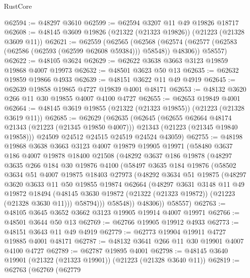 \begin{lexlean}{RustCore}
\begin{coremodule}
@62594 := @48297 @3610
@62599 := @62594 @3207 @11 @49 @19826 @18717
@62608 := @48145 @3609 @19826 (@21322 (@21323 @19826)) (@21223 (@21328 @3609 @11))
@62621 := @62559
    (@62565
      (@62568 (@62574 (@62577 (@62583 (@62586 (@62593 (@62599 @62608 @59384))) @58548)) @48306))
      @58557)
@62622 := @48105 @3624
@62629 := @62622 @3638 @3663 @3123 @19859 @19868 @4007 @19973
@62632 := @48501 @3623 @50 @13
@62635 := @62632 @19859 @19866 @4933
@62639 := @48151 @3622 @11 @49 @4919
@62645 := @62639 @19858 @19865 @4727 @19839 @4001 @48171
@62653 := @48132 @3620 @266 @11 @30 @19855 @4007 @4100 @4727
@62655 := @62653 @19849 @4001
@62664 := @48145 @3619 @19855 (@21322 (@21323 @19855)) (@21223 (@21328 @3619 @11))
@62685 := @62629
    (@62635
      (@62645
        (@62655 @62664 @48174 @21343 (@21223 (@21345 @19850 @4007)))
        @21343
        (@21223 (@21345 @19840 @19858)))
      @24509
      @24512
      @24515
      @24519
      @24524
      @43059)
@62755 := @48198
    @19868
    @3638
    @3663
    @3123
    @4007
    @19879
    @19905
    @19971
    (@58480
      @3637
      @186
      @4007
      @19878
      @18400
      @21508
      (@48292
        @3637
        @186
        @19878
        (@48297
          @3635
          @266
          @184
          @30
          @19876
          @4100
          (@58497
            @3635
            @184
            @19876
            (@58502
              @3634
              @51
              @4007
              @19875
              @18403
              @27973
              (@48292
                @3634
                @51
                @19875
                (@48297
                  @3620
                  @3633
                  @11
                  @50
                  @19855
                  @19874
                  @62664
                  (@48297
                    @3631
                    @3148
                    @11
                    @49
                    @19872
                    @18494
                    (@48145 @3630 @19872 (@21322 (@21323 @19872)) (@21223 (@21328 @3630 @11)))
                    @58794)))
              @58548))
          @48306))
      @58557)
@62763 := @48105 @3645 @3652 @3662 @3123 @19905 @19914 @4007 @19971
@62766 := @48501 @3644 @50 @13
@62769 := @62766 @19905 @19912 @4933
@62773 := @48151 @3643 @11 @49 @4919
@62779 := @62773 @19904 @19911 @4727 @19885 @4001 @48171
@62787 := @48132 @3641 @266 @11 @30 @19901 @4007 @4100 @4727
@62789 := @62787 @19895 @4001
@62798 := @48145 @3640 @19901 (@21322 (@21323 @19901)) (@21223 (@21328 @3640 @11))
@62819 := @62763
    (@62769
      (@62779

\end{coremodule}
\end{lexlean}
